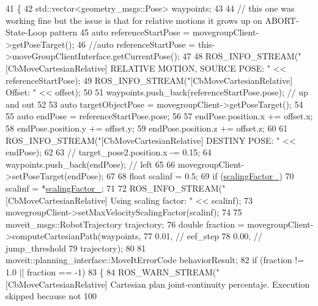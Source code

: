\begin{DoxyCode}
41 \{
42   std::vector<geometry\_msgs::Pose> waypoints;
43 
44   \textcolor{comment}{// this one was working fine but the issue is that for relative motions it grows up on ABORT-State-Loop
       pattern}
45   \textcolor{keyword}{auto} referenceStartPose = movegroupClient->getPoseTarget(); 
46   \textcolor{comment}{//auto referenceStartPose = this->moveGroupClientInterface.getCurrentPose();}
47 
48   ROS\_INFO\_STREAM(\textcolor{stringliteral}{"[CbMoveCartesianRelative] RELATIVE MOTION, SOURCE POSE: "} << referenceStartPose);
49   ROS\_INFO\_STREAM(\textcolor{stringliteral}{"[CbMoveCartesianRelative] Offset: "} << offset);
50 
51   waypoints.push\_back(referenceStartPose.pose);  \textcolor{comment}{// up and out}
52 
53   \textcolor{keyword}{auto} targetObjectPose = movegroupClient->getPoseTarget();
54 
55   \textcolor{keyword}{auto} endPose = referenceStartPose.pose;
56 
57   endPose.position.x += offset.x;
58   endPose.position.y += offset.y;
59   endPose.position.z += offset.z;
60 
61   ROS\_INFO\_STREAM(\textcolor{stringliteral}{"[CbMoveCartesianRelative] DESTINY POSE: "} << endPose);
62 
63   \textcolor{comment}{// target\_pose2.position.x -= 0.15;}
64   waypoints.push\_back(endPose);  \textcolor{comment}{// left}
65 
66   movegroupClient->setPoseTarget(endPose);
67 
68   \textcolor{keywordtype}{float} scalinf = 0.5;
69   \textcolor{keywordflow}{if} (\hyperlink{classcl__move__group__interface_1_1CbMoveCartesianRelative_a2b5e5f05bce94dd3078abfd306c6ef39}{scalingFactor\_})
70     scalinf = *\hyperlink{classcl__move__group__interface_1_1CbMoveCartesianRelative_a2b5e5f05bce94dd3078abfd306c6ef39}{scalingFactor\_};
71 
72   ROS\_INFO\_STREAM(\textcolor{stringliteral}{"[CbMoveCartesianRelative] Using scaling factor: "} << scalinf);
73   movegroupClient->setMaxVelocityScalingFactor(scalinf);
74 
75   moveit\_msgs::RobotTrajectory trajectory;
76   \textcolor{keywordtype}{double} fraction = movegroupClient->computeCartesianPath(waypoints,
77                                                           0.01,  \textcolor{comment}{// eef\_step}
78                                                           0.00,  \textcolor{comment}{// jump\_threshold}
79                                                           trajectory);
80 
81   moveit::planning\_interface::MoveItErrorCode behaviorResult;
82   \textcolor{keywordflow}{if} (fraction != 1.0 || fraction == -1)
83   \{
84     ROS\_WARN\_STREAM(\textcolor{stringliteral}{"[CbMoveCartesianRelative] Cartesian plan joint-continuity percentaje. Execution
       skipped because not 100%
}
\end{DoxyCode}
